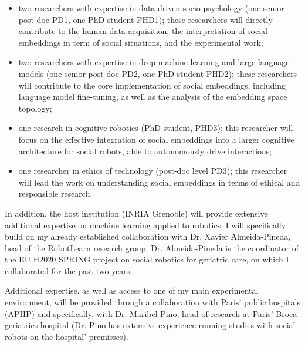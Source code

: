\begin{itemize}

    \item  two researchers with expertise in data-driven
        socio-psychology (one senior post-doc PD1, one PhD student PHD1); these
        researchers will directly contribute to the human data acquisition,
        the interpretation of social embeddings in term of social situations,
        and the experimental work;

    \item two researchers with expertise in deep machine learning and large
        language models (one senior post-doc PD2, one PhD student PHD2); these
        researchers will contribute to the core implementation of social
        embeddings, including language model fine-tuning, as well as the
        analysis of the embedding space topology;

    \item one research in cognitive robotics (PhD student, PHD3); this
        researcher will focus on the effective integration of social
        embeddings into a larger cognitive architecture for social robots, able
        to autonomously drive interactions;

    \item one researcher in ethics of technology (post-doc
        level PD3); this researcher will lead the work on understanding social
        embeddings in terms of ethical and responsible research.
\end{itemize}

In addition, the host institution (INRIA Grenoble) will provide extensive
additional expertise on machine learning applied to robotics. I will specifically build on
my already established collaboration with Dr. Xavier Almeida-Pineda, head of the
RobotLearn research group. Dr. Almeida-Pineda is the coordinator of the EU H2020
SPRING project on social robotics for geriatric care, on which I collaborated
for the past two years.

Additional expertise, as well as access to one of my main experimental
environment, will be provided through a collaboration with Paris' public
hospitals (APHP) and specifically, with Dr. Maribel Pino, head of research at
Paris' Broca geriatrics hospital (Dr. Pino has extensive experience running
studies with social robots on the hospital' premisses).


